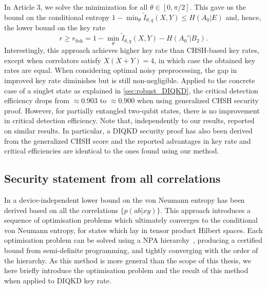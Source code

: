 In Article 3, we solve the minimization for all $\theta\in[0,\pi/2]$. This gave us the bound on the conditional entropy $1-\min_{\theta}\tilde{I}_{\theta,q}(X,Y)\leq H(A_0|E)$ and, hence, the lower bound on the key rate
\begin{equation}
	r \geq r_\mathrm{Sek} = 1 - \min_{\theta} \tilde{I}_{\theta,q}(X,Y) - H(A_0'|B_2).
	\label{eq:Sekatstki}
\end{equation}
Interestingly, this approach achieves higher key rate than CHSH-based key rates, except when correlators satisfy $X(X+Y)=4$, in which case the obtained key rates are equal.
When considering optimal noisy preprocessing, the gap in improved key rate diminishes but is still non-negligible.
Applied to the concrete case of a singlet state as explained in \ref{sec:robust_DIQKD}, the critical detection efficiency drops from $\approx 0.903$ to $\approx 0.900$ when using generalized CHSH security proof.
However, for partially entangled two-qubit states, there is no improvement in critical detection efficiency.
Note that, independently to our results, \cite{Woodhead2021} reported on similar results. In particular, a DIQKD security proof has also been derived from the generalized CHSH score and the reported advantages in key rate and critical efficiencies are identical to the ones found using our method.

\medbreak


\subsection{Security statement from all correlations}
\label{sec:Brown}

In \cite{Brown2021} a device-independent lower bound on the von Neumann entropy has been derived based on all the correlations $\{p(ab|xy)\}$.
This approach introduces a sequence of optimisation problems which ultimately converges to the conditional von Neumann entropy, for states which lay in tensor product Hilbert spaces.
Each optimisation problem can be solved using a NPA hierarchy~\cite{Navascues2007,Pironio2010}, producing a certified bound from semi-definite programming, and tightly converging with the order of the hierarchy.
As this method is more general than the scope of this thesis, we here briefly introduce the optimisation problem and the result of this method when applied to DIQKD key rate.

\medbreak

